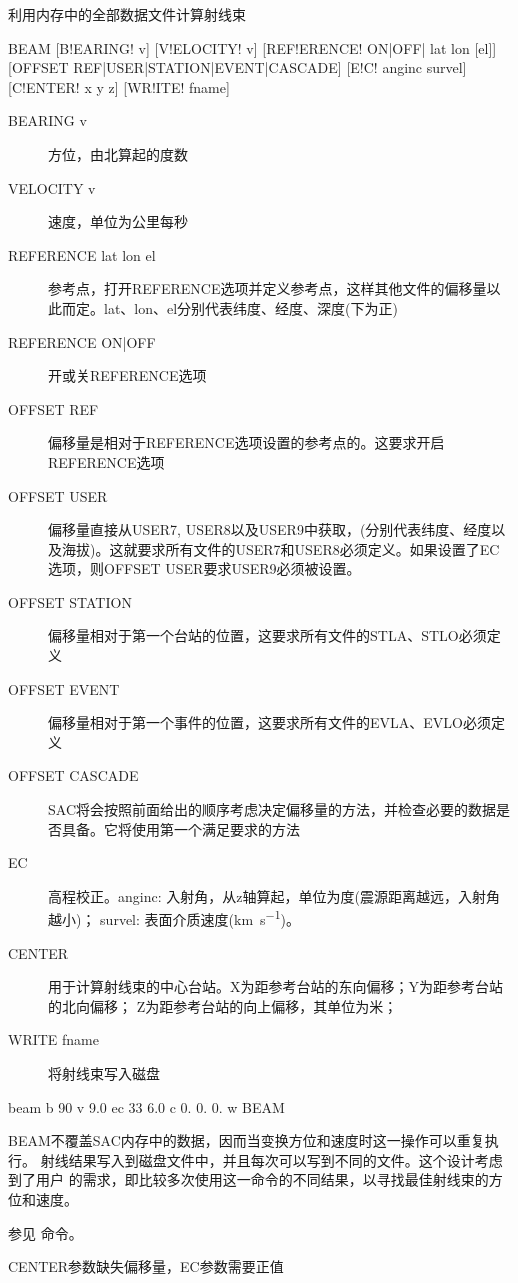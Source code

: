 \label{cmd:beam}

利用内存中的全部数据文件计算射线束

\begin{SACSTX}
BEAM [B!EARING! v] [V!ELOCITY! v] [REF!ERENCE! ON|OFF| lat lon [el]]
    [OFFSET REF|USER|STATION|EVENT|CASCADE] [E!C! anginc survel]
    [C!ENTER! x y z] [WR!ITE! fname]
\end{SACSTX}

\begin{description}
\item [BEARING v] 方位，由北算起的度数
\item [VELOCITY v] 速度，单位为公里每秒
\item [REFERENCE lat lon el] 参考点，打开REFERENCE选项并定义参考点，这样其他文件的偏移量以此而定。lat、lon、el分别代表纬度、经度、深度(下为正)
\item [REFERENCE ON|OFF] 开或关REFERENCE选项
\item [OFFSET REF] 偏移量是相对于REFERENCE选项设置的参考点的。这要求开启REFERENCE选项
\item [OFFSET USER] 偏移量直接从USER7, USER8以及USER9中获取，(分别代表纬度、经度以及海拔)。这就要求所有文件的USER7和USER8必须定义。如果设置了EC选项，则OFFSET USER要求USER9必须被设置。
\item [OFFSET STATION] 偏移量相对于第一个台站的位置，这要求所有文件的STLA、STLO必须定义
\item [OFFSET EVENT] 偏移量相对于第一个事件的位置，这要求所有文件的EVLA、EVLO必须定义
\item [OFFSET CASCADE] SAC将会按照前面给出的顺序考虑决定偏移量的方法，并检查必要的数据是否具备。它将使用第一个满足要求的方法
\item [EC] 高程校正。anginc: 入射角，从z轴算起，单位为度(震源距离越远，入射角越小)；
    survel: 表面介质速度(\si{\km\per\s})。
\item [CENTER] 用于计算射线束的中心台站。X为距参考台站的东向偏移；Y为距参考台站的北向偏移；
	Z为距参考台站的向上偏移，其单位为米；
\item [WRITE fname] 将射线束写入磁盘
\end{description}

\begin{SACDFT}
beam  b 90  v 9.0 ec 33  6.0 c  0. 0. 0. w BEAM
\end{SACDFT}

BEAM不覆盖SAC内存中的数据，因而当变换方位和速度时这一操作可以重复执行。
射线结果写入到磁盘文件中，并且每次可以写到不同的文件。这个设计考虑到了用户
的需求，即比较多次使用这一命令的不同结果，以寻找最佳射线束的方位和速度。

参见  命令。

CENTER参数缺失偏移量，EC参数需要正值
